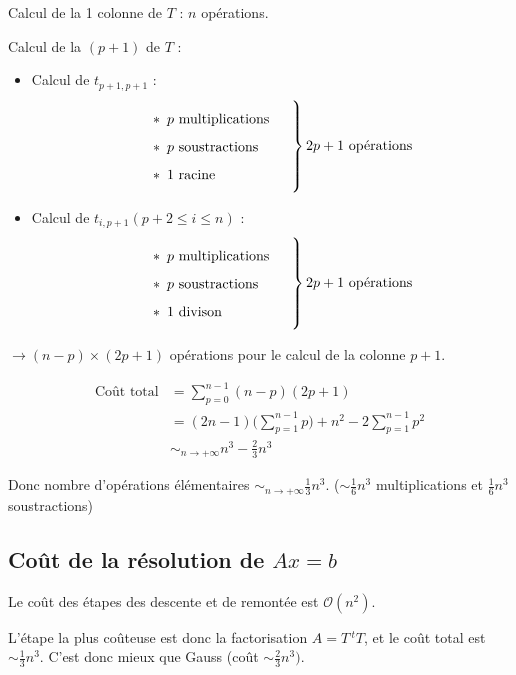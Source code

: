 \documentclass[a4paper,11pt]{article}
\newcommand{\tpo}[1]{\,^t#1}
\theoremstyle{plain} %
\begin{document}
Calcul de la 1 colonne de $T$ : $n$ opérations.

Calcul de la $(p+1)$ de $T$ :

\begin{itemize}[label=$-$]
    \item Calcul de $t_{p+1,p+1}$ :
        \[
            \left.
            \parbox{4cm}{
                \begin{itemize}[label=$*$]
                    \item $p$ multiplications
                    \item $p$ soustractions
                    \item $1$ racine
                \end{itemize}
            }\right\rbrace \text{$2p+1$ opérations}
        \]

    \item Calcul de $t_{i,p+1} (p+2 \leq i \leq n)$ :
        \[
            \left.
            \parbox{4cm}{
                \begin{itemize}[label=$*$]
                    \item $p$ multiplications
                    \item $p$ soustractions
                    \item $1$ divison
                \end{itemize}
            }\right\rbrace \text{$2p+1$ opérations}
        \]
\end{itemize}

$\to (n-p) \times (2p+1)$ opérations pour le calcul de la colonne $p+1$.

\begin{align*}
    \text{Coût total} & = \sum_{p=0}^{n-1} (n-p)(2p+1) \\
    & = (2n-1) \Bigg( \sum_{p=1}^{n-1}p \Bigg) + n^2 - 2 \sum_{p=1}^{n-1} p^2 \\
    & \sim_{n \to + \infty} n^3 - \frac{2}{3} n^3
\end{align*} 

Donc nombre d'opérations élémentaires $\sim_{n \to +\infty} \frac{1}{3}n^3$.
($\sim \frac{1}{6}n^3$ multiplications et $\frac{1}{6}n^3$ soustractions)


\subsection*{Coût de la résolution de $Ax = b$}

Le coût des étapes des descente et de remontée est $\mathcal{O}(n^2)$.

L'étape la plus coûteuse est donc la factorisation $A = T \tpo{T}$, et le coût total est $\sim \frac{1}{3}n^3$. C'est donc mieux que Gauss (coût $\sim \frac{2}{3}n^3)$.
\end{document}
